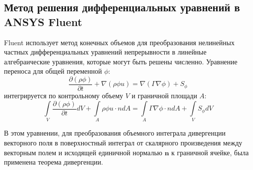 \subsection{Метод решения дифференциальных уравнений в ANSYS Fluent}

Fluent использует метод конечных объемов для преобразования нелинейных частных дифференциальных уравнений непрерывности в линейные алгебраические уравнения, которые могут быть решены численно. 
Уравнение переноса для общей переменной \(\phi\):
\begin{equation}
 \frac{\partial \left(\rho \phi \right)}{\partial t}+\nabla \left(\rho \phi u\right)=\nabla \left(\Gamma \nabla \phi \right)+{S}_{\phi } 
\end{equation}
интегрируется по контрольному объему \(V\) и граничной площади \(A\):
\begin{equation}
 \underset{V}{\int }\frac{\partial \left(\rho \phi \right)}{\partial t}dV+\underset{A}{\int }\rho \phi u\cdot ndA=\underset{A}{\int }\Gamma \nabla \phi \cdot ndA+\underset{V}{\int }S _{\phi}dV \label{eq:math_int_divergent}
\end{equation}

В этом уравнении, для преобразования объемного интеграла дивергенции векторного поля  в поверхностный интеграл от скалярного произведения между векторным полем и исходящей единичной нормалью \(\boldsymbol n\) к граничной ячейке, была применена теорема дивергенции.
 
